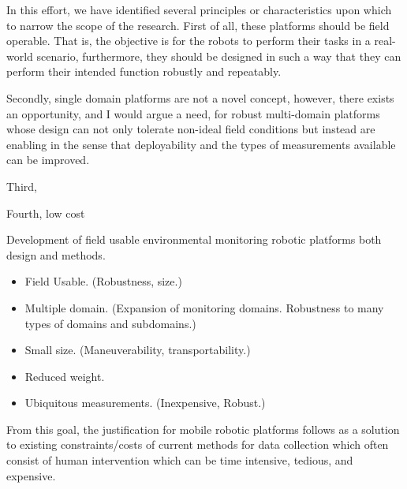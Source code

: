 

In this effort, we have identified several principles or characteristics upon which to narrow the scope of the research. First of all, these platforms should be field operable. That is, the objective is for the robots to perform their tasks in a real-world scenario, furthermore, they should be designed in such a way that they can perform their intended function robustly and repeatably. 

Secondly, single domain platforms are not a novel concept, however, there exists an opportunity, and I would argue a need, for robust multi-domain platforms whose design can not only tolerate non-ideal field conditions but instead are enabling in the sense that deployability and the types of measurements available can be improved. 

Third, 

Fourth, low cost




Development of field usable environmental monitoring robotic platforms both design and methods. 

\begin{itemize}
    \item Field Usable. (Robustness, size.)
    \item Multiple domain. (Expansion of monitoring domains. Robustness to many types of domains and subdomains.) 
    \item Small size. (Maneuverability, transportability.)
    \item Reduced weight.
    \item Ubiquitous measurements. (Inexpensive, Robust.)
\end{itemize}



From this goal, the justification for mobile robotic platforms follows as a solution to existing constraints/costs of current methods for data collection which often consist of human intervention which can be time intensive, tedious, and expensive. 

